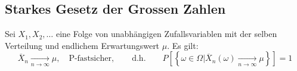 \documentclass[a4paper,titlepage]{article}
\newcommand{\set}[1]{\left\lbrace #1 \right\rbrace}
\begin{document}
\subsection{Starkes Gesetz der Grossen Zahlen}
Sei $X_1, X_2, \dots$ eine Folge von unabhängigen Zufallsvariablen mit der selben Verteilung und endlichem Erwartungswert $\mu$. Es gilt: 
\begin{equation*}
\overline{X}_n \xrightarrow[n \to \infty]{} \mu,\quad \text{P-fastsicher}, \qquad\text{d.h.}\qquad P\left[ \set{\omega \in \Omega \vert \overline{X}_n(\omega) \xrightarrow[n \to \infty]{} \mu} \right] = 1
\end{equation*}
                                                                                                                                                                                                                                                                                                                                                                                                                                                                                                                                                                                                                                                                                                                                                                                                                                                                                                                                                                                                                                                                                                                                                                                                                                                                                                                                                                                                                                                                                                                                                                                                                                                                                                                                                                                                                                                                                                                                                                                                                                                                                                                                                                                                                                                                                                                                                                                                                                                                                                                                                                                                                                                                                                                                                                                                   
\end{document}
